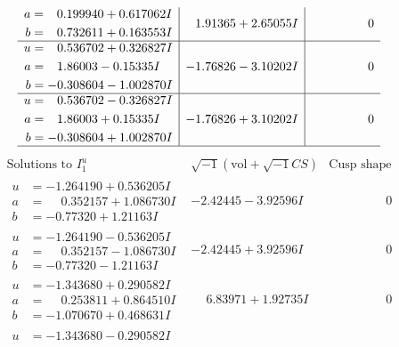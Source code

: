 \documentclass[1p]{elsarticle_modified}
\theoremstyle{definition}
\newcommand{\I}{\sqrt{-1}}
\begin{document}
$$\begin{array}{c|c|c}
\begin{aligned}
a &= \phantom{-}0.199940 + 0.617062 I \\
b &= \phantom{-}0.732611 + 0.163553 I\end{aligned}
 & \phantom{-}1.91365 + 2.65055 I & \phantom{-0.000000 } 0 \\ \hline\begin{aligned}
u &= \phantom{-}0.536702 + 0.326827 I \\
a &= \phantom{-}1.86003 - 0.15335 I \\
b &= -0.308604 - 1.002870 I\end{aligned}
 & -1.76826 - 3.10202 I & \phantom{-0.000000 } 0 \\ \hline\begin{aligned}
u &= \phantom{-}0.536702 - 0.326827 I \\
a &= \phantom{-}1.86003 + 0.15335 I \\
b &= -0.308604 + 1.002870 I\end{aligned}
 & -1.76826 + 3.10202 I & \phantom{-0.000000 } 0\\
 \hline 
 \end{array}$$\newpage$$\begin{array}{c|c|c}  
\text{Solutions to }I^u_{1}& \I (\text{vol} + \sqrt{-1}CS) & \text{Cusp shape}\\
 \hline 
\begin{aligned}
u &= -1.264190 + 0.536205 I \\
a &= \phantom{-}0.352157 + 1.086730 I \\
b &= -0.77320 + 1.21163 I\end{aligned}
 & -2.42445 - 3.92596 I & \phantom{-0.000000 } 0 \\ \hline\begin{aligned}
u &= -1.264190 - 0.536205 I \\
a &= \phantom{-}0.352157 - 1.086730 I \\
b &= -0.77320 - 1.21163 I\end{aligned}
 & -2.42445 + 3.92596 I & \phantom{-0.000000 } 0 \\ \hline\begin{aligned}
u &= -1.343680 + 0.290582 I \\
a &= \phantom{-}0.253811 + 0.864510 I \\
b &= -1.070670 + 0.468631 I\end{aligned}
 & \phantom{-}6.83971 + 1.92735 I & \phantom{-0.000000 } 0 \\ \hline\begin{aligned}
u &= -1.343680 - 0.290582 I \\

\end{aligned}
\end{array}$$
\end{document}
